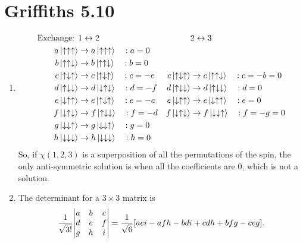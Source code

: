 \documentclass[11pt]{article}
\begin{document}
\newpage



\section*{Griffiths 5.10}
\begin{enumerate}[label=\alph*)]
\item
\begin{align*}
\text{Exchange: } & 1\leftrightarrow 2 &   &  2\leftrightarrow 3\\ 
a\ket{\uparrow\uparrow\uparrow} & \rightarrow a \ket{\uparrow\uparrow\uparrow} \quad  : a = 0\\
b\ket{\uparrow\uparrow\downarrow} & \rightarrow b \ket{\uparrow\uparrow\downarrow} \quad  : b = 0\\
c\ket{\uparrow\downarrow\uparrow} & \rightarrow c \ket{\uparrow\downarrow\uparrow} \quad  : c = -e & c\ket{\uparrow\downarrow\uparrow} & \rightarrow c \ket{\uparrow\uparrow\downarrow} \quad  : c = -b = 0\\
d\ket{\uparrow\downarrow\downarrow} & \rightarrow d \ket{\downarrow\uparrow\downarrow} \quad  : d = -f & d\ket{\uparrow\downarrow\downarrow} & \rightarrow d \ket{\uparrow\downarrow\downarrow} \quad  : d = 0\\
e\ket{\downarrow\uparrow\uparrow} & \rightarrow e \ket{\uparrow\downarrow\uparrow} \quad  : e = -c &
e\ket{\downarrow\uparrow\uparrow} & \rightarrow e \ket{\downarrow\uparrow\uparrow} \quad  : e = 0\\
f\ket{\downarrow\uparrow\downarrow} & \rightarrow f \ket{\uparrow\downarrow\downarrow} \quad  : f = -d & f\ket{\downarrow\uparrow\downarrow} & \rightarrow f \ket{\downarrow\downarrow\uparrow} \quad  : f = -g = 0\\
g\ket{\downarrow\downarrow\uparrow} & \rightarrow g \ket{\downarrow\downarrow\uparrow} \quad  : g = 0\\
h\ket{\downarrow\downarrow\downarrow} & \rightarrow h \ket{\downarrow\downarrow\downarrow} \quad  : h = 0\\
\end{align*}
So, if $\chi(1,2,3)$ is a superposition of all the permutations of the spin, the only anti-symmetric solution is when all the coefficients are 0, which is not a solution. \hspace{4em} \checkmark
\item 
The determinant for a $3\times 3$ matrix is
\[\frac{1}{\sqrt{3!}}\mqty|a&b&c\\d&e&f\\g&h&i| = \frac{1}{\sqrt{6}}[aei - afh-bdi+cdh+bfg - ceg].\]

\end{enumerate}
\end{document}
